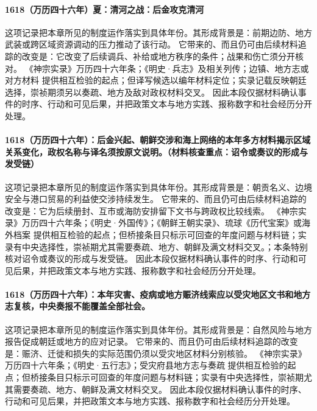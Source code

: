\paragraph{1618（万历四十六年）夏：清河之战：后金攻克清河} 这项记录把本章所见的制度运作落实到具体年份。其形成背景是：前期边防、地方武装或跨区域资源调动的压力推动了该行动。 它带来的、而且仍可由后续材料追踪的改变是：它改变了后续调兵、补给或地方秩序的条件；战果和伤亡须分开核对。 《神宗实录》万历四十六年条；《明史·兵志》及相关列传；边镇、地方志或对方材料 提供相互检验的起点；但译写候选以编年材料定位；实录记载反映朝廷选择，崇祯期须另以奏疏、地方及敌对政权材料交叉。 因此本段仅据材料确认事件的时序、行动和可见后果，并把政策文本与地方实践、报称数字和社会经历分开处理。

\paragraph{1618（万历四十六年）：后金兴起、朝鲜交涉和海上网络的本年多方材料揭示区域关系变化，政权名称与译名须按原文说明。（材料核查重点：诏令或奏议的形成与发受链）} 这项记录把本章所见的制度运作落实到具体年份。其形成背景是：朝贡名义、边境安全与港口贸易的利益使交涉持续发生。 它带来的、而且仍可由后续材料追踪的改变是：它为后续册封、互市或海防安排留下文书与跨政权比较线索。 《神宗实录》万历四十六年条；《明史·外国传》；《朝鲜王朝实录》、琉球《历代宝案》或海外档案 提供相互检验的起点；但桥接条目只标示可回查的年度问题与材料链；实录有中央选择性，崇祯期尤其需要奏疏、地方、朝鲜及满文材料交叉。；本条特别核对诏令或奏议的形成与发受链。 因此本段仅据材料确认事件的时序、行动和可见后果，并把政策文本与地方实践、报称数字和社会经历分开处理。

\paragraph{1618（万历四十六年）：本年灾害、疫病或地方赈济线索应以受灾地区文书和地方志复核，中央奏报不能覆盖全部社会。} 这项记录把本章所见的制度运作落实到具体年份。其形成背景是：自然风险与地方报告促成朝廷或地方的应对记录。 它带来的、而且仍可由后续材料追踪的改变是：赈济、迁徙和损失的实际范围仍须以受灾地区材料分别核验。 《神宗实录》万历四十六年条；《明史·五行志》；受灾府县地方志与奏疏 提供相互检验的起点；但桥接条目只标示可回查的年度问题与材料链；实录有中央选择性，崇祯期尤其需要奏疏、地方、朝鲜及满文材料交叉。 因此本段仅据材料确认事件的时序、行动和可见后果，并把政策文本与地方实践、报称数字和社会经历分开处理。

